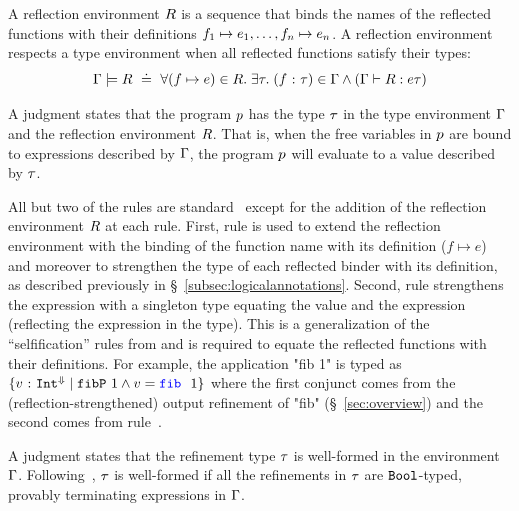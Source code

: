A reflection environment $R$ is a sequence that binds the names
of the reflected functions with their definitions
${f_1} \mapsto {e_1},\ldots,{f_n} \mapsto {e_n}$.
%
A reflection environment respects a type environment
when all reflected functions satisfy their types:
$$
\Gamma \models R \ \doteq\ 
\forall ({f} \mapsto {e}) \in R.\;
\exists \tau.\;
({f} \ \text{:}\ {\tau}) \in \Gamma \wedge
(\Gamma \vdash R : e{\tau})
$$

A judgment \hastype{\env}{\RRenv}{\prog}{\typ} states that
the program $p$ has the type $\tau$ in
the type environment $\Gamma$ and the reflection environment $R$.
That is, when the free variables in $p$ are
bound to expressions described by $\Gamma$, the
program $p$ will evaluate to a value
described by $\tau$.

%
All but two of the rules are standard~\cite{Knowles10,Vazou14}
except for the addition of the reflection environment $R$ at each rule.
%
First, rule \rtreflect is used to
extend the reflection environment with the binding of the function name
with its definition ($f \mapsto e$)
and moreover to strengthen the type of each
reflected binder with its definition, as described previously
in \S~\ref{subsec:logicalannotations}.
%
Second, rule \rtexact strengthens the expression with
a singleton type equating the value and the expression
(\ie reflecting the expression in the type).
%
This is a generalization of the ``selfification'' rules
from \cite{Ou2004,Knowles10} and is required to
equate the reflected functions with their definitions.
%
For example, the application "fib 1" is typed as
${\tref{v}{\tint^\tlabel}{\fibdef\ 1 \wedge v = \fib\ 1}}$ where
the first conjunct comes from the (reflection-strengthened)
output refinement of "fib" (\S~\ref{sec:overview}) and
the second comes from rule~\rtexact.

%
A judgment \iswellformed{\env}{\typ} states that
the refinement type $\tau$ is well-formed in
the environment $\Gamma$.
%
Following~\citet{Vazou14}, $\tau$ is well-formed if all
the refinements in $\tau$ are $\texttt{Bool}$-typed,
provably terminating expressions in $\Gamma$.


